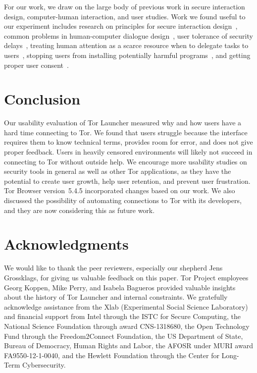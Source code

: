 \documentclass[USenglish,oneside,twocolumn]{article}
\begin{document}
For our work, we draw on the large body of previous work in secure interaction design, computer-human interaction, and user studies. Work we found useful to our experiment includes research on principles for secure interaction design~\cite{yee2002user}, common problems in human-computer dialogue design~\cite{molich1990improving}, user tolerance of security delays~\cite{egelmanplease}, treating human attention as a scarce resource when to delegate tasks to users~\cite{bohme2011security}, stopping users from installing potentially harmful programs~\cite{good2007noticing}, and getting proper user consent~\cite{bohme2010trained}. 

\section{Conclusion} 
\label{sec:conclusion}
Our usability evaluation of Tor Launcher measured why and how users have a hard time connecting to Tor. We found that users struggle because the interface requires them to know technical terms, provides room for error, and does not give proper feedback. Users in heavily censored environments will likely not succeed in connecting to Tor without outside help. We encourage more usability studies on security tools in general as well as other Tor applications, as they have the potential to create user growth, help user retention, and prevent user frustration. Tor Browser version~5.4.5 incorporated  changes based on our work. We also discussed the possibility of automating connections to Tor with its developers, and they are now considering this as future work.

\section {Acknowledgments}
We would like to thank the peer reviewers, especially our shepherd Jens Grossklags, for giving us valuable feedback on this paper. Tor Project employees Georg Koppen, Mike Perry, and Isabela Bagueros provided valuable insights about the history of Tor Launcher and internal constraints. We gratefully acknowledge assistance from the Xlab (Experimental Social Science Laboratory)~\cite{xlab} and
financial support from Intel through the ISTC for Secure Computing,
the National Science Foundation through award CNS-1318680,
the Open Technology Fund through the Freedom2Connect Foundation,
the US Department of State, Bureau of Democracy, Human Rights and Labor,
the AFOSR under MURI award FA9550-12-1-0040,
and the Hewlett Foundation through the Center for Long-Term Cybersecurity.
\end{document}
